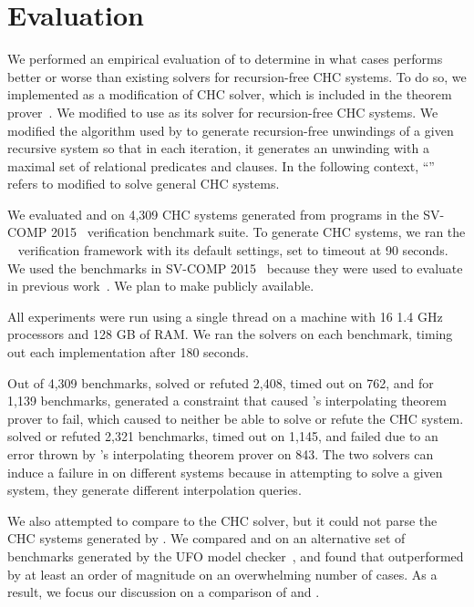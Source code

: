 \section{Evaluation}
\label{sec:evaluation}
We performed an empirical evaluation of \sys to determine in what
cases \sys performs better or worse than existing solvers for
recursion-free CHC systems.
%
To do so, we implemented \sys as a modification of \duality CHC
solver, which is included in the \zthree theorem prover~\cite{z3}.
%
We modified \duality to use \sys as its solver for recursion-free CHC
systems.
%
We modified the algorithm used by \duality to generate recursion-free
unwindings of a given recursive system so that in each iteration, it
generates an unwinding with a maximal set of relational predicates and
clauses.
%
In the following context, ``\sys'' refers to \duality modified to
solve general CHC systems.

We evaluated \sys and \duality on 4,309 CHC systems generated from
programs in the SV-COMP 2015~\cite{svcomp15} verification benchmark
suite.
%
To generate CHC systems, we ran the \seahorn~\cite{gurfinkel15}
verification framework with its default settings, set to timeout at 90
seconds.
%
We used the benchmarks in SV-COMP 2015~\cite{svcomp15} because they
were used to evaluate \duality in previous work~\cite{mcmillan14}.
%
We plan to make \sys publicly available.

All experiments were run using a single thread 
on a machine with 16 1.4 GHz processors and
128 GB of RAM.
%
We ran the solvers on each benchmark, timing out each implementation
after 180 seconds.

Out of 4,309 benchmarks, \sys solved or refuted 2,408, timed out on
762, and for 1,139 benchmarks, generated a constraint that caused
\zthree's interpolating theorem prover to fail, which caused \sys to
neither be able to solve or refute the CHC system.
%
\duality solved or refuted 2,321 benchmarks, timed out on 1,145, and
failed due to an error thrown by \zthree's interpolating theorem
prover on 843.
%
The two solvers can induce a failure in \zthree on different systems
because in attempting to solve a given system, they generate different
interpolation queries.


%
We also attempted to compare \sys to the \eldarica CHC solver, but
it could not parse the CHC systems generated by \seahorn.
%
We compared \sys and \eldarica on an alternative set of benchmarks
generated by the UFO model checker~\cite{albarghouthi12c}, and found
that \sys outperformed \eldarica by at least an order of magnitude on
an overwhelming number of cases.
%
As a result, we focus our discussion on a comparison of \sys and
\duality.

